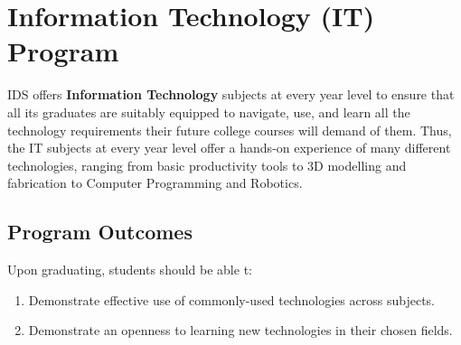 \section{Information Technology (IT) Program}
IDS offers \textbf{Information Technology} subjects at every year level to ensure that all its graduates are suitably equipped to navigate, use, and learn all the technology requirements their future college courses will demand of them. Thus, the IT subjects at every year level offer a hands-on experience of many different technologies, ranging from basic productivity tools to 3D modelling and fabrication to Computer Programming and Robotics.

\subsection{Program Outcomes}
Upon graduating, students should be able t:
\begin{enumerate}
	\item{Demonstrate effective use of commonly-used technologies across subjects.}
	\item{Demonstrate an openness to learning new technologies in their chosen fields.}

\end{enumerate}